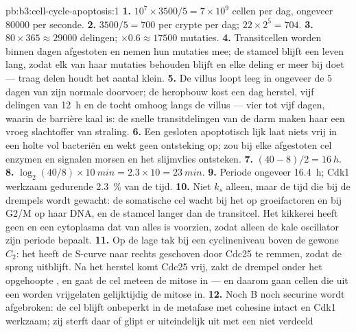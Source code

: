 \begin{solution}{pb:b3:cell-cycle-apoptosis:1}
\textbf{1.} $10^{7}\times 3500/5 = 7\times 10^{9}$ cellen per dag,
ongeveer \num{80000} per seconde.
\textbf{2.} $3500/5 = 700$ per crypte per dag; $22\times 2^{5} = 704$.
\textbf{3.} $80\times 365 \approx \num{29000}$ delingen; $\times 0.6
\approx \num{17500}$ mutaties.
\textbf{4.} Transitcellen worden binnen dagen afgestoten en nemen hun
mutaties mee; de stamcel blijft een leven lang, zodat elk van haar
mutaties behouden blijft en elke deling er meer bij doet --- traag
delen houdt het aantal klein.
\textbf{5.} De villus loopt leeg in ongeveer de $5$ dagen van zijn
normale doorvoer; de heropbouw kost een dag herstel, vijf delingen van
\qty{12}{h} en de tocht omhoog langs de villus --- vier tot vijf dagen,
waarin de barrière kaal is: de snelle transitdelingen van de darm maken
haar een vroeg slachtoffer van straling.
\textbf{6.} Een gesloten apoptotisch lijk laat niets vrij in een holte
vol bacteriën en wekt geen ontsteking op;  zou bij elke
afgestoten cel enzymen en signalen morsen en het slijmvlies ontsteken.
\textbf{7.} $(40 - 8)/2 = \qty{16}{h}$.
\textbf{8.} $\log_{2}(40/8)\times \qty{10}{min} = 2.3\times 10 =
\qty{23}{min}$.
\textbf{9.} Periode ongeveer \qty{16.4}{h}; Cdk1 werkzaam gedurende
\qty{2.3}{\%} van de tijd.
\textbf{10.} Niet $k_{s}$ alleen, maar de tijd die bij de drempels wordt
gewacht: de somatische cel wacht bij het  op
groeifactoren en bij G2/M op haar DNA, en de stamcel langer dan de
transitcel. Het kikkerei heeft geen  en een cytoplasma dat
van alles is voorzien, zodat alleen de kale oscillator zijn periode
bepaalt.
\textbf{11.} Op de lage tak bij een cyclineniveau boven de gewone
$C_{2}$: het  heeft de S-curve naar rechts geschoven door
Cdc25 te remmen, zodat de sprong uitblijft. Na het herstel komt Cdc25
vrij, zakt de drempel onder het opgehoopte , en gaat de cel
meteen de mitose in --- en daarom gaan cellen die uit een 
worden vrijgelaten gelijktijdig de mitose in.
\textbf{12.} Noch  B noch securine wordt afgebroken: de cel
blijft onbeperkt in de metafase met cohesine intact en Cdk1 werkzaam;
zij sterft daar of glipt er uiteindelijk uit met een niet verdeeld

\end{solution}
